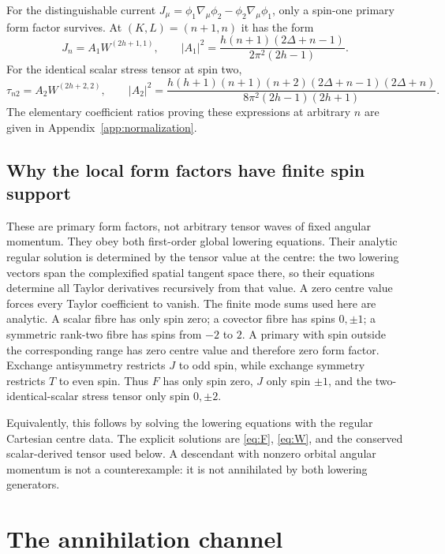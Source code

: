 \documentclass[11pt,a4paper]{article}
\numberwithin{equation}{section}
\theoremstyle{remark}\newtheorem{remark}[theorem]{Remark}
\begin{document}
For the distinguishable current $J_\mu=\phi_1\nabla_\mu\phi_2-\phi_2\nabla_\mu\phi_1$, only a spin-one primary form factor survives. At $(K,L)=(n+1,n)$ it has the form
\begin{equation}
 J_n=A_1 W^{(2h+1,1)},\qquad
 |A_1|^2=\frac{h(n+1)(2\Delta+n-1)}{2\pi^2(2h-1)}.
 \label{eq:Jnorm}
\end{equation}
For the identical scalar stress tensor at spin two,
\begin{equation}
 \tau_{n2}=A_2W^{(2h+2,2)},\qquad
 |A_2|^2=\frac{h(h+1)(n+1)(n+2)(2\Delta+n-1)(2\Delta+n)}
 {8\pi^2(2h-1)(2h+1)}.
 \label{eq:taunorm}
\end{equation}
The elementary coefficient ratios proving these expressions at arbitrary $n$ are given in Appendix~\ref{app:normalization}.

\subsection{Why the local form factors have finite spin support}

These are primary form factors, not arbitrary tensor waves of fixed angular momentum. They obey both first-order global lowering equations. Their analytic regular solution is determined by the tensor value at the centre: the two lowering vectors span the complexified spatial tangent space there, so their equations determine all Taylor derivatives recursively from that value. A zero centre value forces every Taylor coefficient to vanish. The finite mode sums used here are analytic. A scalar fibre has only spin zero; a covector fibre has spins $0,\pm1$; a symmetric rank-two fibre has spins from $-2$ to $2$. A primary with spin outside the corresponding range has zero centre value and therefore zero form factor. Exchange antisymmetry restricts $J$ to odd spin, while exchange symmetry restricts $T$ to even spin. Thus $F$ has only spin zero, $J$ only spin $\pm1$, and the two-identical-scalar stress tensor only spin $0,\pm2$.

Equivalently, this follows by solving the lowering equations with the regular Cartesian centre data. The explicit solutions are \eqref{eq:F}, \eqref{eq:W}, and the conserved scalar-derived tensor used below. A descendant with nonzero orbital angular momentum is not a counterexample: it is not annihilated by both lowering generators.

\section{The annihilation channel}
\label{sec:annihilation}
\end{document}
